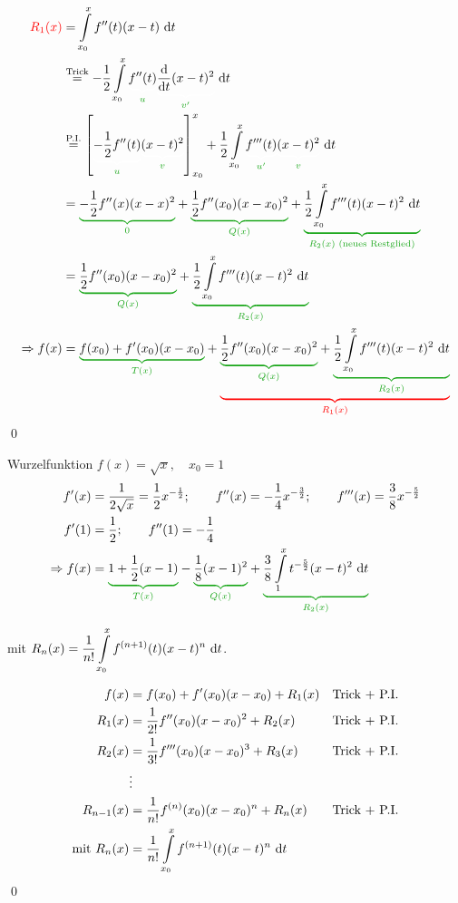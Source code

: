 \vspace{-1cm}
\begin{align*}
\red{R_1(x)}&=\int\limits_{x_0}^{x}f''(t)(x-t)\intd{t}\\
&\stackrel{\text{Trick}}{=}-\frac{1}{2}\int\limits_{x_0}^{x}\greenunder{f''(t)}{u}\greenunder{\df{}{t}(x-t)^2}{v'}\intd{t}\\
&\stackrel{\text{P.I.}}{=}\left[\greenunder{-\frac{1}{2}f''(t)}{u}\greenunder{(x-t)^2}{v}\right]_{x_0}^x+\frac{1}{2}\int\limits_{x_0}^{x}\greenunder{f'''(t)}{u'}\greenunder{(x-t)^2}{v}\intd{t}\\
&=\greenunderbrace{-\frac{1}{2}f''(x)(x-x)^2}{0}+\greenunderbrace{\frac{1}{2}f''(x_0)(x-x_0)^2}{Q(x)}+\greenunderbrace{\frac{1}{2}\int\limits_{x_0}^{x}f'''(t)(x-t)^2\intd{t}}{R_2(x)\text{ (neues Restglied)}}\\
&=\greenunderbrace{\frac{1}{2}f''(x_0)(x-x_0)^2}{Q(x)}+\greenunderbrace{\frac{1}{2}\int\limits_{x_0}^{x}f'''(t)(x-t)^2\intd{t}}{R_2(x)}\\
\Rightarrow f(x)&=\greenunderbrace{f(x_0)+f'(x_0)(x-x_0)}{T(x)}+\redunderbrace{\greenunderbrace{\frac{1}{2}f''(x_0)(x-x_0)^2}{Q(x)}+\greenunderbrace{\frac{1}{2}\int\limits_{x_0}^{x}f'''(t)(x-t)^2\intd{t}}{R_2(x)}}{R_1(x)}
\end{align*}
\qed

\Bsp Wurzelfunktion $f(x)=\sqrt{x},\quad x_0=1$
\begin{align*}
f'(x)&=\dfrac{1}{2\sqrt{x}} = \frac{1}{2}x^{-\frac{1}{2}};\qquad f''(x)=-\frac{1}{4}x^{-\frac{3}{2}};\qquad f'''(x)=\frac{3}{8}x^{-\frac{5}{2}}\\
f'(1)&=\frac{1}{2};\qquad f''(1)=-\frac{1}{4}\\
\Rightarrow f(x)&=\greenunderbrace{1+\frac{1}{2}(x-1)}{T(x)}-\greenunderbrace{\frac{1}{8}(x-1)^2}{Q(x)}+\greenunderbrace{\frac{3}{8}\int\limits_{1}^{x}t^{-\frac{5}{2}}(x-t)^2\intd{t}}{R_2(x)}
\end{align*}
	
mit $R_n(x)=\dfrac{1}{n!}\displaystyle\int\limits_{x_0}^{x}f^{(n+1)}(t)(x-t)^n\ \mathrm{d}t$.

\Beweis\quad
\begin{align*}
f(x)&=f(x_0)+f'(x_0)(x-x_0)+R_1(x)&\text{Trick + P.I.}\\
R_1(x)&=\dfrac{1}{2!}f''(x_0)(x-x_0)^2+R_2(x)&\text{Trick + P.I.}\\
R_2(x)&=\dfrac{1}{3!}f'''(x_0)(x-x_0)^3+R_3(x)&\text{Trick + P.I.}\\
&\vdots\\
R_{n-1}(x)&=\dfrac{1}{n!}f^{(n)}(x_0)(x-x_0)^n+R_n(x)&\text{Trick + P.I.}\\
\text{mit }R_n(x)&=\dfrac{1}{n!}\int\limits_{x_0}^{x}f^{(n+1)}(t)(x-t)^n\ \mathrm{d}t
\end{align*}
\qed

